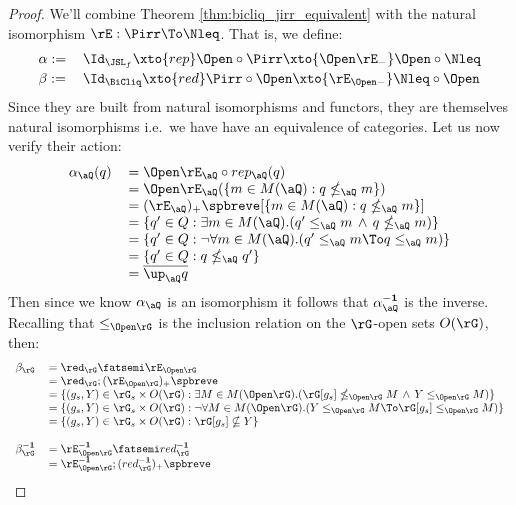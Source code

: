 \documentclass{article}
\begin{document}
\begin{proof}
We'll combine Theorem \ref{thm:bicliq_jirr_equivalent} with the natural isomorphism $\rE : \Pirr \To \Nleq$. That is, we define:
\[
\begin{tabular}{ll}
$\alpha :=$ & $ \Id_{\JSL_f} \xto{rep} \Open \circ \Pirr \xto{\Open \rE_-} \Open \circ \Nleq$
\\[0.5ex]
$\beta :=$ & $\Id_{\BiCliq} \xto{red} \Pirr \circ \Open \xto{\rE_{\Open-}} \Nleq \circ \Open$
\end{tabular}
\]
Since they are built from natural isomorphisms and functors, they are themselves natural isomorphisms i.e.\ we have have an equivalence of categories. Let us now verify their action:
\[
\begin{tabular}{lll}
$\alpha_\aQ (q)$
&
$= \Open \rE_\aQ \circ rep_\aQ (q)$
\\&
$= \Open \rE_\aQ(\{ m \in M(\aQ) : q \nleq_\aQ m \})$
\\&
$= (\rE_\aQ)_+\spbreve[\{ m \in M(\aQ) : q \nleq_\aQ m \}]$
\\&
$= \{ q' \in Q : \exists m \in M(\aQ).( q' \leq_\aQ m \,\land\, q \nleq_\aQ m ) \}$
\\&
$= \{ q' \in Q : \neg\forall m \in M(\aQ).( q' \leq_\aQ m \To q \leq_\aQ m) \}$
\\&
$= \{ q' \in Q : q \nleq_\aQ q' \}$
\\&
$= \overline{\up_\aQ q}$
\end{tabular}
\]
Then since we know $\alpha_\aQ$ is an isomorphism it follows that $\alpha_\aQ^{\bf-1}$ is the inverse. Recalling that $\leq_{\Open\rG}$ is the inclusion relation on the $\rG$-open sets $O(\rG)$, then:
\[
\begin{tabular}{lll}
$\beta_\rG$
&
$= \red_\rG \fatsemi \rE_{\Open\rG}$
\\&
$= \red_\rG ; (\rE_{\Open\rG})_+\spbreve$
\\&
$= \{ (g_s,Y) \in \rG_s \times O(\rG) : \exists M \in M(\Open\rG).( \rG[g_s] \nleq_{\Open\rG} M \,\land\, Y \leq_{\Open\rG} M  ) \}$
\\&
$= \{ (g_s,Y) \in \rG_s \times O(\rG) : \neg\forall M \in M(\Open\rG).( Y \leq_{\Open\rG} M \To  \rG[g_s] \leq_{\Open\rG} M) \}$
\\&
$= \{ (g_s,Y) \in \rG_s \times O(\rG) : \rG[g_s] \nsubseteq Y \}$
\\
\\
$\beta_\rG^{\bf-1}$
&
$= \rE_{\Open\rG}^{\bf-1} \fatsemi red_\rG^{\bf-1}$
\\&
$= \rE_{\Open\rG}^{\bf-1} ; (red_\rG^{\bf-1})_+\spbreve$

\end{tabular}\]
\end{proof}
\end{document}
